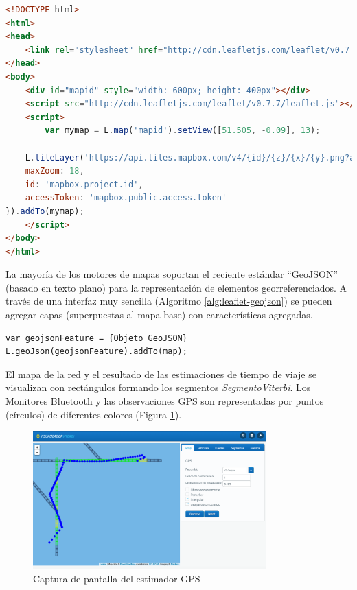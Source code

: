  \begin{lstlisting}[language=Html, caption=Configuración de la visualización de mapas, label=alg:leaflet]
<!DOCTYPE html>
<html>
<head>
	<link rel="stylesheet" href="http://cdn.leafletjs.com/leaflet/v0.7.7/leaflet.css" />
</head>
<body>
	<div id="mapid" style="width: 600px; height: 400px"></div>
	<script src="http://cdn.leafletjs.com/leaflet/v0.7.7/leaflet.js"></script>
	<script>
		var mymap = L.map('mapid').setView([51.505, -0.09], 13);

    L.tileLayer('https://api.tiles.mapbox.com/v4/{id}/{z}/{x}/{y}.png?access_token={accessToken}', {
    maxZoom: 18,
    id: 'mapbox.project.id',
    accessToken: 'mapbox.public.access.token'
}).addTo(mymap);
	</script>
</body>
</html>
\end{lstlisting}

La mayoría de los motores de mapas soportan el reciente estándar ``GeoJSON'' (basado en texto plano) para la representación de elementos georreferenciados. A través de una interfaz muy sencilla (Algoritmo \ref{alg:leaflet-geojson}) se pueden agregar capas (superpuestas al mapa base) con características agregadas.

\clearpage

\begin{lstlisting}[language=Html, caption=Carga de una representación GeoJSON en Leaflet, label=alg:leaflet-geojson]
var geojsonFeature = {Objeto GeoJSON}
L.geoJson(geojsonFeature).addTo(map);
\end{lstlisting}

El mapa de la red y el resultado de las estimaciones de tiempo de viaje se visualizan con rectángulos formando los segmentos \textit{SegmentoViterbi}. Los Monitores Bluetooth y las observaciones GPS son representadas por puntos (círculos) de diferentes colores (Figura \ref{fig:captura-viterbi-gps}).


\begin{figure}[!htp]
	\centering
	\includegraphics[width=0.8\textwidth]{images/captura-viterbi-gps.png}
	\captionsetup{width=0.7\textwidth}
	\caption{Captura de pantalla del estimador GPS}
    \label{fig:captura-viterbi-gps}
\end{figure}

